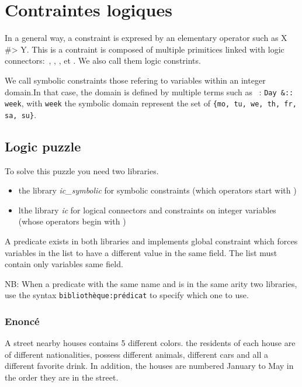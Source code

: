 
\chapter{Contraintes logiques} \label{tp2}
In a general way, a constraint is expresed by an elementary operator such as X \#> Y. This is a contraint is composed of multiple primitices linked with logic connectors:~,
, \code{=>}, \code{\#=} et . We also call them logic constrints.

We call symbolic constraints those refering to variables within an integer domain.In that case, the domain is defined by multiple terms such as ~:
\verb|Day &:: week|, with \verb|week| the symbolic domain represent the set of \verb|{mo, tu, we, th, fr, sa, su}|.

\section{Logic puzzle}

To solve this puzzle you need two libraries.

\begin{itemize}
 \item the library \emph{ic\_symbolic} for symbolic constraints (which operators start with
\code{\&})
\item lthe library \emph{ic} for logical connectors and constraints on integer variables (whose operators begin with \code{\#})
\end{itemize}
A predicate  exists in both
libraries and implements global constraint which forces
variables in the list  to have a different value in
the same field. The list must contain only variables
same field.

NB: When a predicate with the same name and is in the same arity
two libraries, use the syntax \verb|bibliothèque:prédicat|
to specify which one to use.


\subsection{Enoncé}

A street nearby houses contains 5 different colors. the
residents of each house are of different nationalities,
possess different animals, different cars and all
a different favorite drink. In addition, the houses are numbered
January to May in the order they are in the street.

